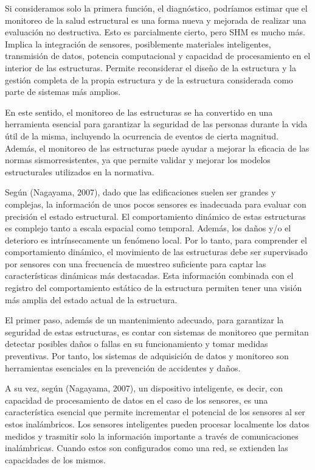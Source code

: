 \documentclass[12pt,letterpaper]{article}
\begin{document}
Si consideramos solo la primera función, el diagnóstico, podríamos estimar que el monitoreo de la salud estructural es una forma nueva y mejorada de realizar una evaluación no destructiva. Esto es parcialmente cierto, pero SHM es mucho más. Implica la integración de sensores, posiblemente materiales inteligentes, transmisión de datos, potencia computacional y capacidad de procesamiento en el interior de las estructuras. Permite reconsiderar el diseño de la estructura y la gestión completa de la propia estructura y de la estructura considerada como parte de sistemas más amplios.



En este sentido, el monitoreo de las estructuras se ha convertido en una herramienta esencial para garantizar la seguridad de las personas durante la vida útil de la misma, incluyendo la ocurrencia de eventos de cierta magnitud. Además, el monitoreo de las estructuras puede ayudar a mejorar la eficacia de las normas sismorresistentes, ya que permite validar y mejorar los modelos estructurales utilizados en la normativa.

Según (Nagayama, 2007), dado que las edificaciones suelen ser grandes y complejas, la información
de unos pocos sensores es inadecuada para evaluar con precisión el estado estructural. El
comportamiento dinámico de estas estructuras es complejo tanto a escala espacial como temporal. Además,
los daños y/o el deterioro es intrínsecamente un fenómeno local. Por lo tanto, para comprender el
comportamiento dinámico, el movimiento de las estructuras debe ser supervisado por sensores
con una frecuencia de muestreo suficiente para captar las características dinámicas más destacadas. Esta información combinada con el registro del comportamiento estático de la estructura permiten tener una visión más amplia del estado actual de la estructura.


El primer paso, además de un mantenimiento adecuado, para garantizar la seguridad de estas estructuras, es contar con sistemas de monitoreo que permitan detectar posibles daños o fallas en su funcionamiento y tomar medidas preventivas. Por tanto, los sistemas de adquisición de datos y monitoreo son herramientas esenciales en la prevención de accidentes y daños.

A su vez, según (Nagayama, 2007), un dispositivo inteligente, es decir, con capacidad de procesamiento de datos en el caso de los sensores, es una característica esencial que permite incrementar el potencial de los sensores al ser estos inalámbricos. Los sensores inteligentes pueden procesar localmente los datos medidos y trasmitir solo la información importante a través de comunicaciones inalámbricas. Cuando estos son configurados como una red, se extienden las capacidades de los mismos.
\end{document}
